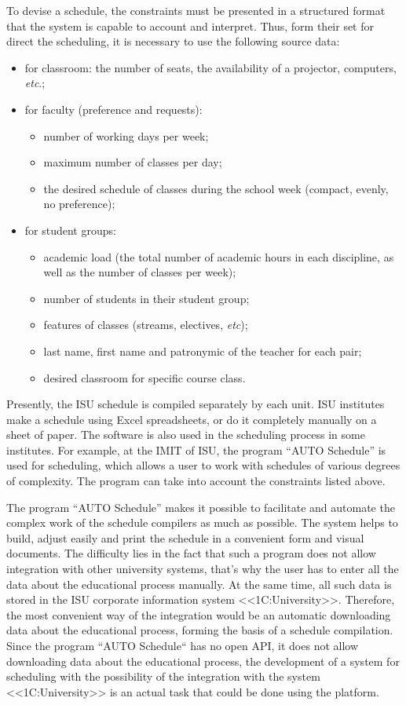 \documentclass[
]{aiitart}
\begin{document}
To devise a schedule, the constraints must be presented in a structured format that the system is capable to account and interpret.  Thus, form their set for direct the scheduling, it is necessary to use the following source data:
\begin{itemize}
    \item for classroom: the number of seats, the availability of a projector, computers, \emph{etc}.;
    \item for faculty (preference and requests):
    \begin{itemize}
        \item number of working days per week;
        \item maximum number of classes per day;
        \item the desired schedule of classes during the school week (compact, evenly, no preference);
    \end{itemize}
    \item for student groups:
    \begin{itemize}
        \item academic load (the total number of academic hours in each discipline, as well as the number of classes per week);
        \item number of students in their student group;
        \item features of classes (streams, electives, \emph{etc});
        \item last name, first name and patronymic of the teacher for each pair;
        \item desired classroom for specific course class.
    \end{itemize}
\end{itemize}

Presently, the ISU schedule is compiled separately by each unit.  ISU institutes make a schedule using Excel spreadsheets, or do it completely manually on a sheet of paper. The software is also used in the scheduling process in some institutes. For example, at the IMIT of ISU, the program ``AUTO Schedule'' is used for scheduling, which allows a user to work with schedules of various degrees of complexity. The program can take into account the constraints listed above.

The program ``AUTO Schedule'' makes it possible to facilitate and automate the complex work of the schedule compilers as much as possible. The system helps to build, adjust easily and print the schedule in a convenient form  and visual documents. The difficulty lies in the fact that such a program does not allow integration with other university systems, that's why the user has to enter all the data about the educational process manually.  At the same time, all such data is stored in the ISU corporate information system <<1C:University>>. Therefore, the most convenient way of the integration would be an automatic downloading data about the educational process, forming the basis of a schedule compilation. Since the program ``AUTO Schedule`` has no open API, it does not allow downloading data about the educational process, the development of a system for scheduling with the possibility of the integration with the system <<1C:University>> is an actual task that could be done using the platform.
\end{document}
